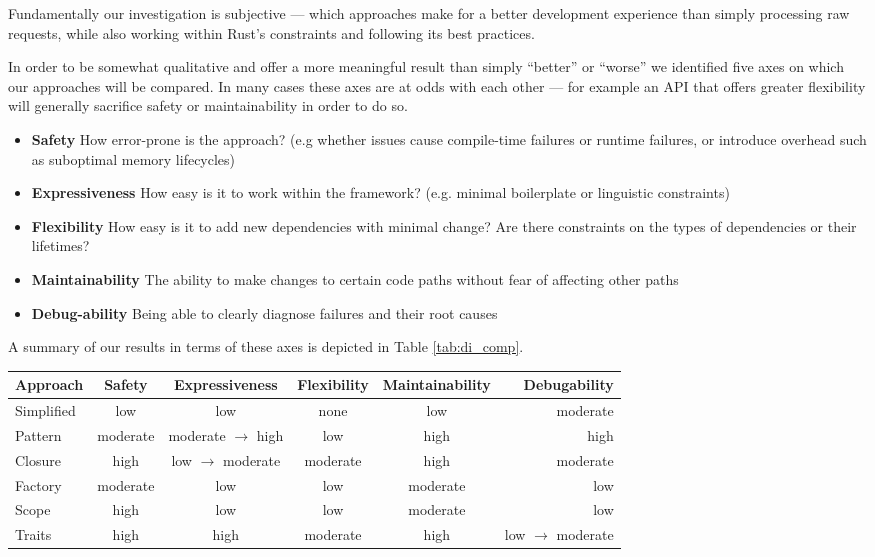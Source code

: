 \documentclass[sigconf]{acmart}
\begin{document}
Fundamentally our investigation is subjective --- which approaches make for a better development experience than simply processing raw requests, while also working within Rust's constraints and following its best practices.

In order to be somewhat qualitative and offer a more meaningful result than simply ``better'' or ``worse'' we identified five axes on which our approaches will be compared. In many cases these axes are at odds with each other --- for example an API that offers greater flexibility will generally sacrifice safety or maintainability in order to do so.

\begin{itemize}
\item \textbf{Safety} How error-prone is the approach? (e.g whether issues cause compile-time failures or runtime failures, or introduce overhead such as suboptimal memory lifecycles)
\item \textbf{Expressiveness} How easy is it to work within the framework? (e.g. minimal boilerplate or linguistic constraints)
\item \textbf{Flexibility} How easy is it to add new dependencies with minimal change? Are there constraints on the types of dependencies or their lifetimes?
\item \textbf{Maintainability} The ability to make changes to certain code paths without fear of affecting other paths
\item \textbf{Debug-ability} Being able to clearly diagnose failures and their root causes
\end{itemize}

A summary of our results in terms of these axes is depicted in Table \ref{tab:di_comp}.
 
\begin{table*}
  \caption{Qualitative comparison of differing mechanisms investigated}
  \label{tab:di_comp}
  \begin{tabular}{l*{4}{c}r}
    \toprule
    Approach & Safety & Expressiveness & Flexibility & Maintainability & Debugability \\
    \midrule
    Simplified & low & low & none & low & moderate\\
    Pattern & moderate & moderate $\rightarrow$ high & low & high & high\\
    Closure & high & low $\rightarrow$ moderate & moderate & high & moderate\\
    Factory & moderate & low & low & moderate & low\\
    Scope & high & low & low & moderate & low\\
    Traits & high & high & moderate & high & low $\rightarrow$ moderate\\
  \bottomrule
\end{tabular}
\end{table*}
\end{document}
